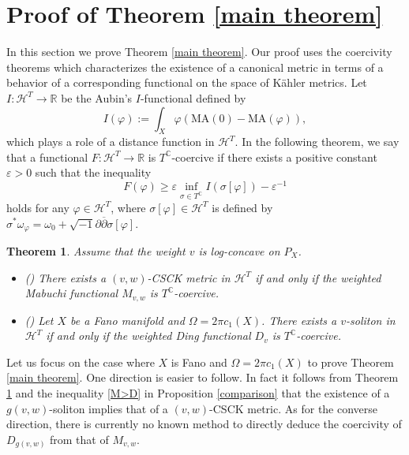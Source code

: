 \documentclass[12pt]{amsart}
\numberwithin{equation}{section}%
\theoremstyle{plain}
\newtheorem{theorem}{Theorem}[section]
\theoremstyle{definition}
\newcommand{\deldel}{\sqrt{-1}\partial \overline{\partial}}
\newcommand{\e}{\varepsilon}
\newcommand{\MA}{\mathrm{MA}}
\renewcommand{\phi}{\varphi}
\renewcommand{\geq}{\geqslant}
\newcommand{\1}{\mathbf{1}}
\begin{document}
\section{Proof of Theorem \ref{main theorem}}
In this section we prove Theorem \ref{main theorem}.
Our proof uses the coercivity theorems which characterizes
the existence of a canonical metric in terms of a behavior of a corresponding
functional on the space of K\"ahler metrics.
Let $I:\mathcal{H}^{T}\to\mathbb{R}$ be the Aubin's $I$-functional defined by
\begin{equation}
I(\phi):=\int_{X}\phi\left(\MA(0)-\MA(\phi)\right),
\end{equation}
which plays a role of a distance function in $\mathcal{H}^{T}$.
In the following theorem, we say that a functional $F:\mathcal{H}^{T}\to\mathbb{R}$ is $T^{\mathbb{C}}$-coercive if
there exists a positive constant $\e>0$ such that the inequality
\begin{equation}
F(\phi)\geq\e\inf_{\sigma\in T^{\mathbb{C}}}I(\sigma[\phi])-\e^{-1}
\end{equation}
holds for any $\phi\in\mathcal{H}^{T}$,
where $\sigma[\phi]\in\mathcal{H}^{T}$ is defined by 
$\sigma^{*}\omega_{\phi}=\omega_{0}+\deldel\sigma[\phi]$.
\begin{theorem}\label{coercivity}
Assume that the weight $v$ is log-concave on $P_{X}$.
\begin{itemize}
\item {\rm (\cite{DJL24, DJL25, HanLiu25})}
There exists a $(v,w)$-CSCK metric in $\mathcal{H}^{T}$ if and only if
the weighted Mabuchi functional $M_{v,w}$ is $T^{\mathbb{C}}$-coercive.
\item {\rm (\cite{HaLi20})} Let $X$ be a Fano manifold and $\Omega=2\pi c_{1}(X)$.
There exists a $v$-soliton in $\mathcal{H}^{T}$ if and only if
the weighted Ding functional $D_{v}$ is $T^{\mathbb{C}}$-coercive.
\end{itemize}
\end{theorem}

Let us focus on the case where $X$ is Fano and $\Omega=2\pi c_{1}(X)$
to prove Theorem \ref{main theorem}.
One direction is easier to follow.
In fact it follows from Theorem \ref{coercivity} and
the inequality \eqref{M>D} in Proposition \ref{comparison}
that the existence of a $g(v,w)$-soliton implies that of a $(v,w)$-CSCK metric.
As for the converse direction, there is currently no known method 
to directly deduce the coercivity of $D_{g(v,w)}$ from that of $M_{v,w}$.
\end{document}
